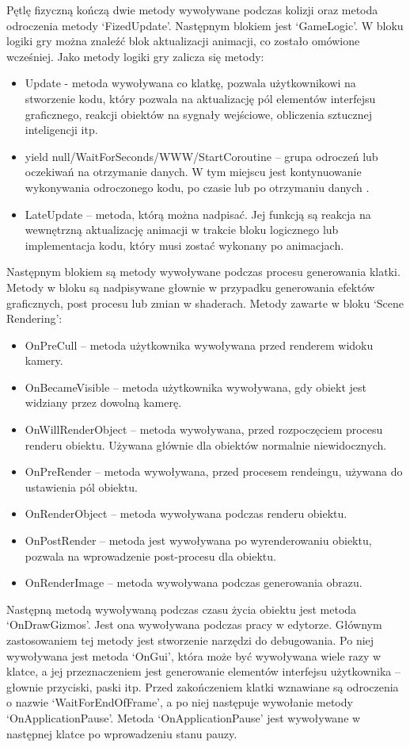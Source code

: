 \documentclass[12pt,twoside]{article}
\begin{document}
Pętlę fizyczną kończą dwie metody wywoływane podczas kolizji oraz metoda
odroczenia metody ‘FizedUpdate’. Następnym blokiem jest ‘GameLogic’. W bloku
logiki gry można znaleźć blok aktualizacji animacji, co zostało omówione
wcześniej. Jako metody logiki gry zalicza się metody:
\begin{itemize}
\item Update - metoda wywoływana co klatkę, pozwala użytkownikowi na stworzenie
kodu, który pozwala na aktualizację pól elementów interfejsu graficznego,
reakcji obiektów na sygnały wejściowe, obliczenia sztucznej inteligencji itp. 
\item yield null/WaitForSeconds/WWW/StartCoroutine – grupa odroczeń lub
oczekiwań na otrzymanie danych. W tym miejscu jest kontynuowanie wykonywania
odroczonego kodu, po czasie lub po otrzymaniu danych \cite{Unity:yield}. 
\item LateUpdate – metoda, którą można nadpisać. Jej funkcją są reakcja na
wewnętrzną aktualizację animacji w trakcie bloku logicznego lub implementacja
kodu, który musi zostać wykonany po animacjach. 
\end{itemize}
Następnym blokiem są metody wywoływane podczas procesu generowania klatki.
Metody w bloku są nadpisywane głownie w przypadku generowania efektów
graficznych, post procesu lub zmian w shaderach. Metody zawarte w bloku ‘Scene
Rendering’:
\begin{itemize}
\item OnPreCull – metoda użytkownika wywoływana przed renderem widoku kamery\cite{Unity:onCurl}.  
\item OnBecameVisible – metoda użytkownika wywoływana, gdy obiekt jest widziany
przez dowolną kamerę. 
\item OnWillRenderObject – metoda wywoływana, przed rozpoczęciem procesu renderu
obiektu. Używana głównie dla obiektów normalnie niewidocznych.
\item OnPreRender – metoda wywoływana, przed procesem rendeingu, używana do
ustawienia pól obiektu\cite{Unity:OnPreRender}.
\item OnRenderObject – metoda wywoływana podczas renderu obiektu.
\item OnPostRender – metoda jest wywoływana po wyrenderowaniu obiektu, pozwala
na wprowadzenie post-procesu dla obiektu\cite{Unity:OnPostRender}.
\item OnRenderImage – metoda wywoływana podczas generowania obrazu.
\end{itemize}
Następną metodą wywoływaną podczas czasu życia obiektu jest metoda
‘OnDrawGizmos’. Jest ona wywoływana podczas pracy w edytorze. Głównym
zastosowaniem tej metody jest stworzenie narzędzi do debugowania. Po niej
wywoływana jest metoda ‘OnGui’, która może być wywoływana wiele razy w klatce, a
jej przeznaczeniem jest generowanie elementów interfejsu użytkownika – głownie
przyciski, paski itp. Przed zakończeniem klatki wznawiane są odroczenia o nazwie
‘WaitForEndOfFrame’, a po niej następuje wywołanie metody ‘OnApplicationPause’.
Metoda ‘OnApplicationPause’ jest wywoływane w następnej klatce po wprowadzeniu
stanu pauzy.
\end{document}
